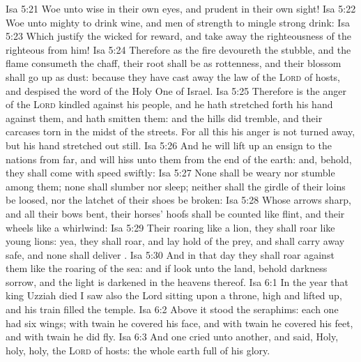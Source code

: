 \vs Isa 5:21 Woe unto  wise in their own eyes, and prudent in their own sight!
\vs Isa 5:22 Woe unto  mighty to drink wine, and men of strength to mingle strong drink:
\vs Isa 5:23 Which justify the wicked for reward, and take away the righteousness of the righteous from him!
\vs Isa 5:24 Therefore as the fire devoureth the stubble, and the flame consumeth the chaff,  their root shall be as rottenness, and their blossom shall go up as dust: because they have cast away the law of the \textsc{Lord} of hosts, and despised the word of the Holy One of Israel.
\vs Isa 5:25 Therefore is the anger of the \textsc{Lord} kindled against his people, and he hath stretched forth his hand against them, and hath smitten them: and the hills did tremble, and their carcases  torn in the midst of the streets. For all this his anger is not turned away, but his hand  stretched out still.
\vs Isa 5:26 And he will lift up an ensign to the nations from far, and will hiss unto them from the end of the earth: and, behold, they shall come with speed swiftly:
\vs Isa 5:27 None shall be weary nor stumble among them; none shall slumber nor sleep; neither shall the girdle of their loins be loosed, nor the latchet of their shoes be broken:
\vs Isa 5:28 Whose arrows  sharp, and all their bows bent, their horses' hoofs shall be counted like flint, and their wheels like a whirlwind:
\vs Isa 5:29 Their roaring  like a lion, they shall roar like young lions: yea, they shall roar, and lay hold of the prey, and shall carry  away safe, and none shall deliver .
\vs Isa 5:30 And in that day they shall roar against them like the roaring of the sea: and if  look unto the land, behold darkness  sorrow, and the light is darkened in the heavens thereof.
\vs Isa 6:1 In the year that king Uzziah died I saw also the Lord sitting upon a throne, high and lifted up, and his train filled the temple.
\vs Isa 6:2 Above it stood the seraphims: each one had six wings; with twain he covered his face, and with twain he covered his feet, and with twain he did fly.
\vs Isa 6:3 And one cried unto another, and said, Holy, holy, holy,  the \textsc{Lord} of hosts: the whole earth  full of his glory.
